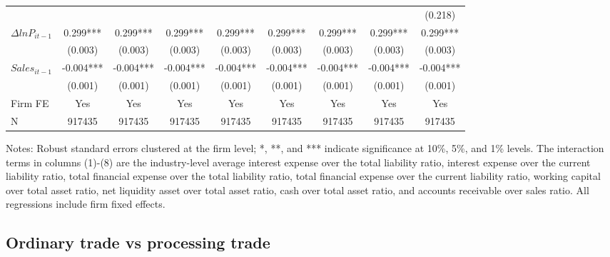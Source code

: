 \begin{table}[htbp]
{\begin{threeparttable}
\begin{tabular}{lcccccccc}
          &       &       &       &       &       &       &       & (0.218) \\
    $\Delta ln P_{it-1}$ & 0.299*** & 0.299*** & 0.299*** & 0.299*** & 0.299*** & 0.299*** & 0.299*** & 0.299*** \\
          & (0.003) & (0.003) & (0.003) & (0.003) & (0.003) & (0.003) & (0.003) & (0.003) \\
    $Sales_{it-1}$ & -0.004*** & -0.004*** & -0.004*** & -0.004*** & -0.004*** & -0.004*** & -0.004*** & -0.004*** \\
          & (0.001) & (0.001) & (0.001) & (0.001) & (0.001) & (0.001) & (0.001) & (0.001) \\
    \midrule
    Firm FE & Yes   & Yes   & Yes   & Yes   & Yes   & Yes   & Yes   & Yes \\
    N     & 917435 & 917435 & 917435 & 917435 & 917435 & 917435 & 917435 & 917435 \\
        \bottomrule
    \end{tabular}
        \begin{tablenotes}
            \footnotesize
            \item Notes: Robust standard errors clustered at the firm level;  *, **, and *** indicate significance at 10\%, 5\%, and 1\% levels. The interaction terms in columns (1)-(8) are the industry-level average interest expense over the total liability ratio, interest expense over the current liability ratio, total financial expense over the total liability ratio, total financial expense over the current liability ratio, working capital over total asset ratio, net liquidity asset over total asset ratio, cash over total asset ratio, and accounts receivable over sales ratio. All regressions include firm fixed effects.
	\end{tablenotes}
    \end{threeparttable}
    }
    \label{tab.non-linearity}
\end{table}

\subsection{Ordinary trade vs processing trade}


